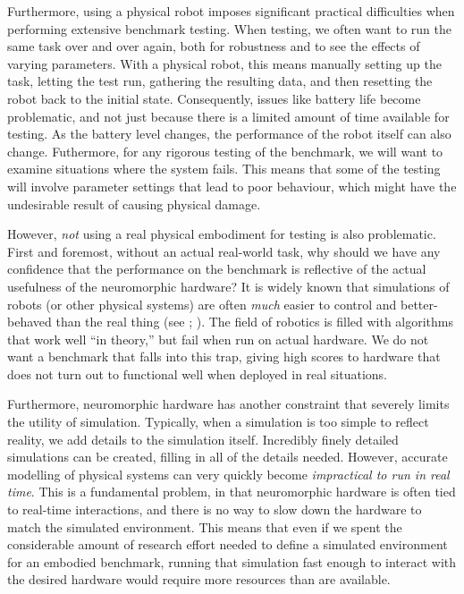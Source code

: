 \documentclass{frontiersSCNS} %
\begin{document}
Furthermore, using a physical robot imposes significant practical
difficulties when performing extensive benchmark testing.  When testing, we
often want to run the same task over and over again, both for robustness and
to see the effects of varying parameters.  With a physical robot, this means
manually setting up the task, letting the test run, gathering the resulting
data, and then resetting the robot back to the initial state.  Consequently,
issues like battery life become problematic, and not just because there is a
limited amount of time available for testing.  As the battery level changes,
the performance of the robot itself can also change.  Futhermore, for any
rigorous testing of the benchmark, we will want to examine situations where
the system fails.  This means that some of the testing will involve parameter
settings that lead to poor behaviour, which might have the undesirable 
result of causing physical damage.

However, \emph{not} using a real physical embodiment for testing is also
problematic.  First and foremost, without an actual real-world task, why
should we have any confidence that the performance on the benchmark is
reflective of the actual usefulness of the neuromorphic hardware?  It is
widely known that simulations of robots (or other physical systems) are
often \emph{much} easier to control and better-behaved than the real thing 
(see \citealt{Jakobi95}; \citealt{Koos2013}).  The
field of robotics is filled with algorithms that work well ``in theory,'' but
fail when run on actual hardware.  We do not want a benchmark that falls into
this trap, giving high scores to hardware that does not turn out to
functional well when deployed in real situations.

Furthermore, neuromorphic hardware has another constraint that severely limits
the utility of simulation.  Typically, when a simulation is
too simple to reflect reality, we add details to the simulation itself.
Incredibly finely detailed simulations can be created, filling in all of the
details needed.  However, accurate modelling of physical systems can very quickly
become \emph{impractical to run in real time}.
This is a fundamental problem, in that neuromorphic
hardware is often tied to real-time interactions, and there is no way to slow down
the hardware to match the simulated environment.  This means that even if
we spent the considerable amount of research effort needed to define a
simulated environment for an embodied benchmark, running that simulation 
fast enough to interact with the desired hardware would require more
resources than are available.  
\end{document}
